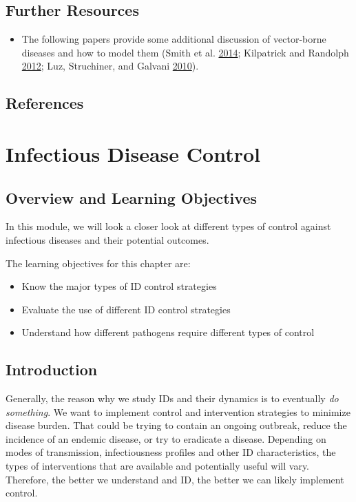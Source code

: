 \documentclass[]{book}
\providecommand{\tightlist}{%
  \setlength{\itemsep}{0pt}\setlength{\parskip}{0pt}}
\theoremstyle{definition}
\theoremstyle{definition}
\theoremstyle{definition}
\theoremstyle{remark}
\begin{document}
\section{Further Resources}\label{further-resources-7}

\begin{itemize}
\tightlist
\item
  The following papers provide some additional discussion of
  vector-borne diseases and how to model them (Smith et al.
  \protect\hyperlink{ref-smith14}{2014}; Kilpatrick and Randolph
  \protect\hyperlink{ref-kilpatrick12}{2012}; Luz, Struchiner, and
  Galvani \protect\hyperlink{ref-luz10}{2010}).
\end{itemize}

\section{References}\label{references-8}

\chapter{Infectious Disease Control}\label{infectious-disease-control}

\section{Overview and Learning
Objectives}\label{overview-and-learning-objectives-8}

In this module, we will look a closer look at different types of control
against infectious diseases and their potential outcomes.

The learning objectives for this chapter are:

\begin{itemize}
\tightlist
\item
  Know the major types of ID control strategies
\item
  Evaluate the use of different ID control strategies
\item
  Understand how different pathogens require different types of control
\end{itemize}

\section{Introduction}\label{introduction-8}

Generally, the reason why we study IDs and their dynamics is to
eventually \emph{do something}. We want to implement control and
intervention strategies to minimize disease burden. That could be trying
to contain an ongoing outbreak, reduce the incidence of an endemic
disease, or try to eradicate a disease. Depending on modes of
transmission, infectiousness profiles and other ID characteristics, the
types of interventions that are available and potentially useful will
vary. Therefore, the better we understand and ID, the better we can
likely implement control.
\end{document}
